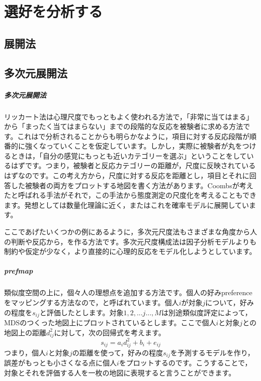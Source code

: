 \documentclass{ltjsbook}
\begin{document}
\chapter{選好を分析する}
\label{H09_Preference}
\section{展開法}
\section{多次元展開法}

\paragraph{多次元展開法}リッカート法は心理尺度でもっともよく使われる方法で，「非常に当てはまる」から「まったく当てはまらない」までの段階的な反応を被験者に求める方法です。これはで分析されることからも明らかなように，項目に対する反応段階が順番的に強くなっていくことを仮定しています。しかし，実際に被験者が丸をつけるときは，「自分の感覚にもっとも近いカテゴリーを選ぶ」ということをしているはずです。つまり，被験者と反応カテゴリーの距離が，尺度に反映されているはずなのです。この考え方から，尺度に対する反応を距離とし，項目とそれに回答した被験者の両方をプロットする地図を書く方法があります。Coombsが考えたと呼ばれる手法がそれで，この手法から態度測定の尺度化を考えることもできます。発想としては数量化理論に近く，また\citet{shimizu2018}はこれを確率モデルに展開しています。

ここであげたいくつかの例にあるように，多次元尺度法もさまざまな角度から人の判断や反応から，を作る方法です。多次元尺度構成法は因子分析モデルよりも制約や仮定が少なく，より直接的に心理的反応をモデル化しようとしています。


\paragraph{prefmap}類似度空間の上に，個々人の理想点を追加する方法です。個人の好みpreferenceをマッピングする方法なので，と呼ばれています。個人$i$が対象$j$について，好みの程度を$s_{ij}$と評価したとします。対象$1,2,...j...,M$は別途類似度評定によって，MDSのつくった地図上にプロットされているとします。ここで個人$i$と対象$j$との地図上の距離$d_{ij}^2$に対して，次の回帰式を考えます。
\[ s_{ij} = a_i d_{ij}^2 + b_i + e_{ij} \]
つまり，個人$i$と対象$j$の距離を使って，好みの程度$s_{ij}$を予測するモデルを作り，誤差がもっとも小さくなる点に個人$i$をプロットするのです。こうすることで，対象とそれを評価する人を一枚の地図に表現すると言うことができます。
\end{document}
